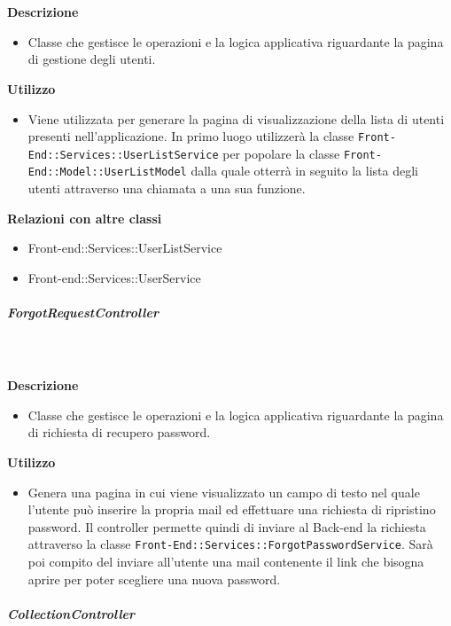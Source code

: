 				\textbf{\\ \\ Descrizione} 
					\begin{itemize}
						\item[] Classe che gestisce le operazioni e la logica applicativa riguardante la pagina di gestione degli utenti.
					\end{itemize}      
				\textbf{Utilizzo}  
					\begin{itemize}
						\item[] Viene utilizzata per generare la pagina di visualizzazione della lista di utenti presenti nell'applicazione. In primo luogo utilizzerà la classe \texttt{Front-End::Services::UserListService} per popolare la classe \texttt{Front-End::Model::UserListModel} dalla quale otterrà in seguito la lista degli utenti attraverso una chiamata a una sua funzione.
					\end{itemize}
					\textbf{Relazioni con altre classi}
					\begin{itemize}
							\item{Front-end::Services::UserListService}
							\item{Front-end::Services::UserService}
					\end{itemize}
			\subparagraph{ForgotRequestController}
				
				\textbf{\\ \\ Descrizione} 
					\begin{itemize}
						\item[] Classe che gestisce le operazioni e la logica applicativa riguardante la pagina di richiesta di recupero password.
					\end{itemize}      
				\textbf{Utilizzo}  
					\begin{itemize}
						\item[] Genera una pagina in cui viene visualizzato un campo di testo nel quale l'utente può inserire la propria mail ed effettuare una richiesta di ripristino password. Il controller permette quindi di inviare al Back-end la richiesta attraverso la classe \texttt{Front-End::Services::ForgotPasswordService}. Sarà poi compito del  inviare all'utente una mail contenente il link che bisogna aprire per poter scegliere una nuova password.
					\end{itemize}
			\subparagraph{CollectionController}
				
